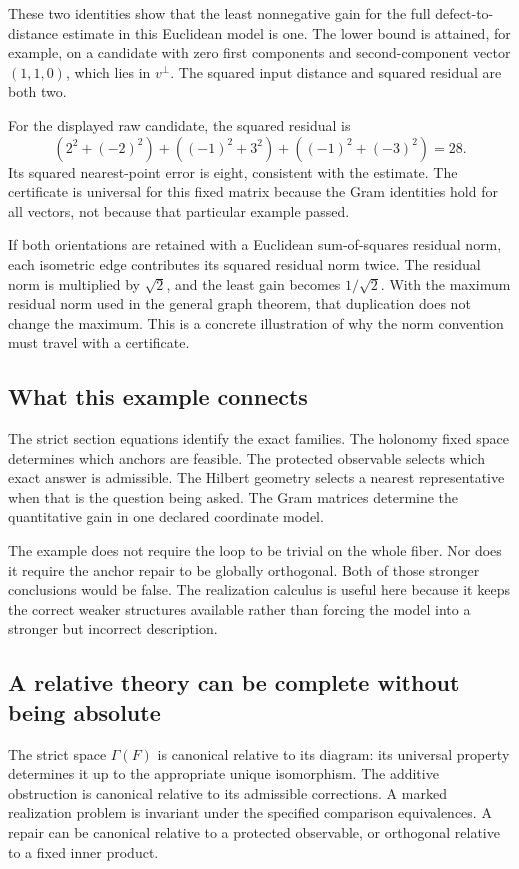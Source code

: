 These two identities show that the least nonnegative gain for the full defect-to-distance estimate in this Euclidean model is one. The lower bound is attained, for example, on a candidate with zero first components and second-component vector \((1,1,0)\), which lies in \(v^\perp\). The squared input distance and squared residual are both two.

For the displayed raw candidate, the squared residual is
\[
 (2^2+(-2)^2)+((-1)^2+3^2)+((-1)^2+(-3)^2)=28.
\]
Its squared nearest-point error is eight, consistent with the estimate. The certificate is universal for this fixed matrix because the Gram identities hold for all vectors, not because that particular example passed.

If both orientations are retained with a Euclidean sum-of-squares residual norm, each isometric edge contributes its squared residual norm twice. The residual norm is multiplied by \(\sqrt2\), and the least gain becomes \(1/\sqrt2\). With the maximum residual norm used in the general graph theorem, that duplication does not change the maximum. This is a concrete illustration of why the norm convention must travel with a certificate.

\subsection{What this example connects}
The strict section equations identify the exact families. The holonomy fixed space determines which anchors are feasible. The protected observable selects which exact answer is admissible. The Hilbert geometry selects a nearest representative when that is the question being asked. The Gram matrices determine the quantitative gain in one declared coordinate model.

The example does not require the loop to be trivial on the whole fiber. Nor does it require the anchor repair to be globally orthogonal. Both of those stronger conclusions would be false. The realization calculus is useful here because it keeps the correct weaker structures available rather than forcing the model into a stronger but incorrect description.



\label{KS:sec:meaning}
\subsection{A relative theory can be complete without being absolute}
The strict space \(\Gamma(F)\) is canonical relative to its diagram: its universal property determines it up to the appropriate unique isomorphism. The additive obstruction is canonical relative to its admissible corrections. A marked realization problem is invariant under the specified comparison equivalences. A repair can be canonical relative to a protected observable, or orthogonal relative to a fixed inner product.

